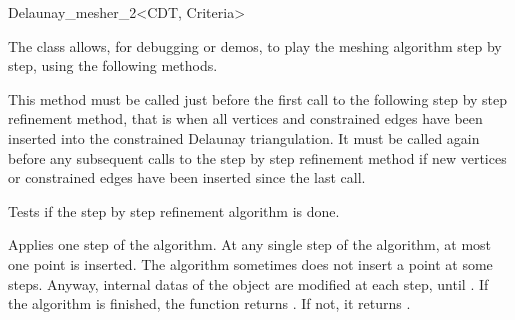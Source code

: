 \begin{ccRefClass}{Delaunay_mesher_2<CDT, Criteria>}
\begin{ccAdvanced}
\end{ccAdvanced}


\begin{ccAdvanced}

The \ccRefName{} class allows, for debugging or demos, to play the
meshing algorithm step by step, using the following methods.

         { This method must be called just before the first
             call to the following step by step refinement method,
             that is when all vertices and constrained edges have been
             inserted into the constrained Delaunay triangulation. It
             must be called again before any subsequent calls to the
             step by step refinement method if new vertices or constrained
             edges have been inserted since the last call.}

         {  Tests if the step by step refinement algorithm is done. }

         { Applies one step of the algorithm. At any single step of the
         algorithm, 
         at most one point is inserted. The algorithm sometimes does not
         insert a point at some steps. Anyway, internal datas of the
         \ccRefName{} object are modified at each step, until
         . If the algorithm is finished,
         the function returns . If not, it returns .}

\end{ccAdvanced}

\end{ccRefClass}

